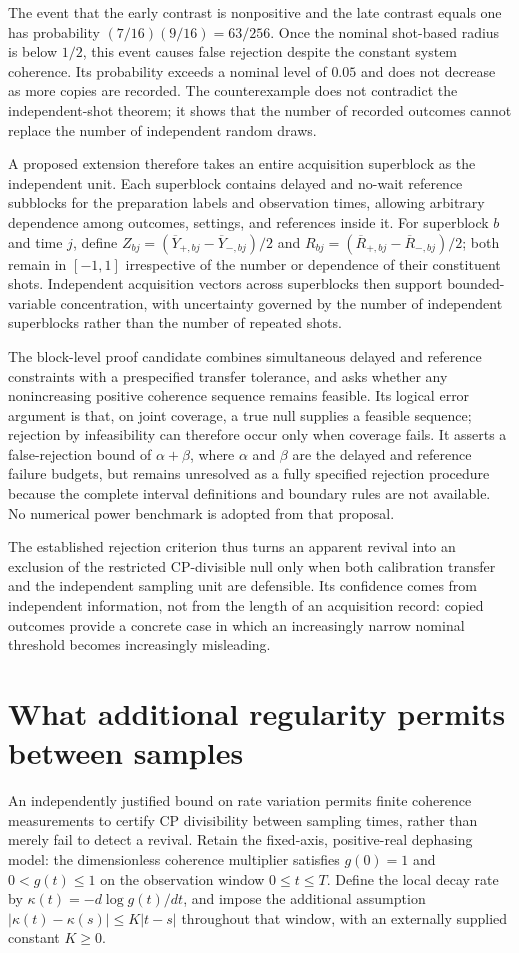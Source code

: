 \documentclass[11pt]{article}
\begin{document}
The event that the early contrast is nonpositive and the late contrast equals one has probability $(7/16)(9/16)=63/256$. Once the nominal shot-based radius is below $1/2$, this event causes false rejection despite the constant system coherence. Its probability exceeds a nominal level of $0.05$ and does not decrease as more copies are recorded. The counterexample does not contradict the independent-shot theorem; it shows that the number of recorded outcomes cannot replace the number of independent random draws.

A proposed extension therefore takes an entire acquisition superblock as the independent unit. Each superblock contains delayed and no-wait reference subblocks for the preparation labels and observation times, allowing arbitrary dependence among outcomes, settings, and references inside it. For superblock $b$ and time $j$, define $Z_{bj}=(\overline Y_{+,bj}-\overline Y_{-,bj})/2$ and $R_{bj}=(\overline R_{+,bj}-\overline R_{-,bj})/2$; both remain in $[-1,1]$ irrespective of the number or dependence of their constituent shots. Independent acquisition vectors across superblocks then support bounded-variable concentration, with uncertainty governed by the number of independent superblocks rather than the number of repeated shots.

The block-level proof candidate combines simultaneous delayed and reference constraints with a prespecified transfer tolerance, and asks whether any nonincreasing positive coherence sequence remains feasible. Its logical error argument is that, on joint coverage, a true null supplies a feasible sequence; rejection by infeasibility can therefore occur only when coverage fails. It asserts a false-rejection bound of $\alpha+\beta$, where $\alpha$ and $\beta$ are the delayed and reference failure budgets, but remains unresolved as a fully specified rejection procedure because the complete interval definitions and boundary rules are not available. No numerical power benchmark is adopted from that proposal.

The established rejection criterion thus turns an apparent revival into an exclusion of the restricted CP-divisible null only when both calibration transfer and the independent sampling unit are defensible. Its confidence comes from independent information, not from the length of an acquisition record: copied outcomes provide a concrete case in which an increasingly narrow nominal threshold becomes increasingly misleading.

\section{What additional regularity permits between samples}
An independently justified bound on rate variation permits finite coherence measurements to certify CP divisibility between sampling times, rather than merely fail to detect a revival. Retain the fixed-axis, positive-real dephasing model: the dimensionless coherence multiplier satisfies $g(0)=1$ and $0<g(t)\leq1$ on the observation window $0\leq t\leq T$. Define the local decay rate by $\kappa(t)=-d\log g(t)/dt$, and impose the additional assumption $|\kappa(t)-\kappa(s)|\leq K|t-s|$ throughout that window, with an externally supplied constant $K\geq0$.
\end{document}
